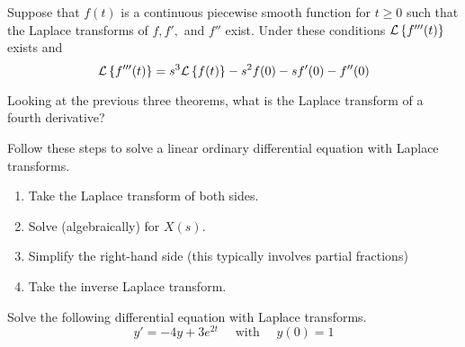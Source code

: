 \begin{thm}
    Suppose that $f(t)$ is a continuous piecewise smooth function for $t \ge 0$ such that
    the Laplace transforms of $f,f',$ and $f''$ exist.  Under these conditions
    $\mathcal{L}\left\{ f'''(t) \right\}$ exists and
    \[ \mathcal{L}\left\{ f'''(t) \right\} = s^3 \mathcal{L}\left\{ f(t) \right\} - s^2 f(0) - sf'(0) - f''(0) \]
\end{thm}

\begin{problem}
    Looking at the previous three theorems, what is the Laplace transform of a fourth
    derivative?
\end{problem}


\begin{technique}
    Follow these steps to solve a linear ordinary differential equation with Laplace
    transforms.
        \begin{enumerate}
            \item Take the Laplace transform of both sides.
            \item Solve (algebraically) for $X(s)$.
            \item Simplify the right-hand side (this typically involves partial fractions)
            \item Take the inverse Laplace transform.
        \end{enumerate}
\end{technique}

\begin{problem}
    Solve the following differential equation with Laplace transforms.
        \[ y' = -4y + 3e^{2t} \quad \text{ with } \quad y(0) = 1 \]
\end{problem}
\solution{
    \[ \lap{y'} = -4 \lap{y} + 3 \lap{e^{2t}} \quad \implies \quad s Y - y(0) = -4Y + 3
    \left( \frac{1}{s-2} \right) \]
    \[ \implies (s+4)Y = 1 + \frac{3}{s-2} = \frac{s+1}{s-2} \implies Y(s) =
    \frac{s+1}{(s+4)(s-2)} \]
    \[ \implies Y(s) = \frac{1}{2(s-2)} + \frac{1}{2(s+4)} \]
    \[ \implies y(t) = \frac{1}{2} e^{2t} + \frac{1}{2} e^{-4t} \]
}




